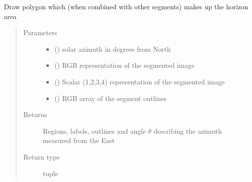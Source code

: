 \documentclass[letterpaper,10pt,english]{sphinxmanual}
\begin{document}
\begin{fulllineitems}
\label{\detokenize{createregions:createregions.draw_horizon_area}}
Draw polygon which (when combined with other segments) makes up the horizon area
\begin{quote}\begin{description}
\item[{Parameters}] \leavevmode\begin{itemize}
\item {} 
 () \textendash{} solar azimuth in degrees from North

\item {} 
 () \textendash{} RGB representation of the segmented image

\item {} 
 () \textendash{} Scalar (1,2,3,4) representation of the segmented image

\item {} 
 () \textendash{} RGB array of the segment outlines

\end{itemize}

\item[{Returns}] \leavevmode
Regions, labels, outlines and angle \(\theta\) describing the azimuth measured from the East

\item[{Return type}] \leavevmode
tuple

\end{description}\end{quote}

\end{fulllineitems}

\end{document}
